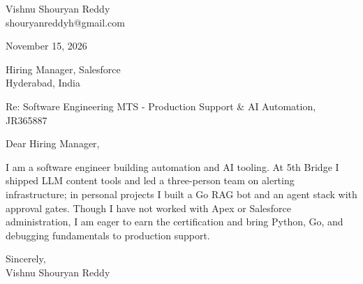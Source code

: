 \documentclass[a4paper,11pt]{article}
\begin{document}
\pagestyle{empty}
Vishnu Shouryan Reddy \\
shouryanreddyh@gmail.com

\vspace{1em}
November 15, 2026

\vspace{1em}
Hiring Manager, Salesforce \\
Hyderabad, India

\vspace{1em}
Re: Software Engineering MTS - Production Support \& AI Automation, JR365887

\vspace{1em}
Dear Hiring Manager,

\vspace{0.5em}
I am a software engineer building automation and AI tooling. At 5th Bridge I shipped LLM content tools and led a three-person team on alerting infrastructure; in personal projects I built a Go RAG bot and an agent stack with approval gates. Though I have not worked with Apex or Salesforce administration, I am eager to earn the certification and bring Python, Go, and debugging fundamentals to production support.

\vspace{1em}
Sincerely, \\
Vishnu Shouryan Reddy
\end{document}
